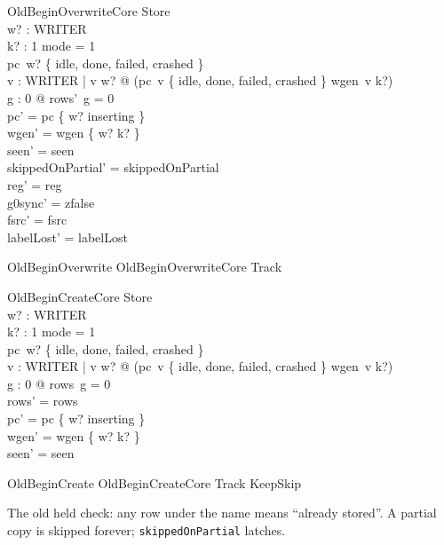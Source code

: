 \documentclass[a4paper,10pt,fleqn]{article}
\newcommand{\field}[1]{\texttt{#1}}
\begin{document}
\begin{schema}{OldBeginOverwriteCore}
\Delta Store \\ w? : WRITER \\ k? : 1 
\where
mode = 1 \\
pc~w? \in \{ idle, done, failed, crashed \} \\
\forall v : WRITER | v \neq w? @
  (pc~v \in \{ idle, done, failed, crashed \} \lor wgen~v \neq k?) \\
\forall g : 0  @ rows'~g = 0 \\
pc' = pc \oplus \{ w? \mapsto inserting \} \\
wgen' = wgen \oplus \{ w? \mapsto k? \} \\
seen' = seen \\
skippedOnPartial' = skippedOnPartial \\
reg' = reg \\
g0sync' = zfalse \\
fsrc' = fsrc \\
labelLost' = labelLost
\end{schema}

\begin{zed}
OldBeginOverwrite  OldBeginOverwriteCore \land Track
\end{zed}

\begin{schema}{OldBeginCreateCore}
\Delta Store \\ w? : WRITER \\ k? : 1 
\where
mode = 1 \\
pc~w? \in \{ idle, done, failed, crashed \} \\
\forall v : WRITER | v \neq w? @
  (pc~v \in \{ idle, done, failed, crashed \} \lor wgen~v \neq k?) \\
\forall g : 0  @ rows~g = 0 \\
rows' = rows \\
pc' = pc \oplus \{ w? \mapsto inserting \} \\
wgen' = wgen \oplus \{ w? \mapsto k? \} \\
seen' = seen
\end{schema}

\begin{zed}
OldBeginCreate  OldBeginCreateCore \land Track \land KeepSkip
\end{zed}

The old held check: any row under the name means ``already stored''. A
partial copy is skipped forever; \field{skippedOnPartial} latches.
\end{document}
